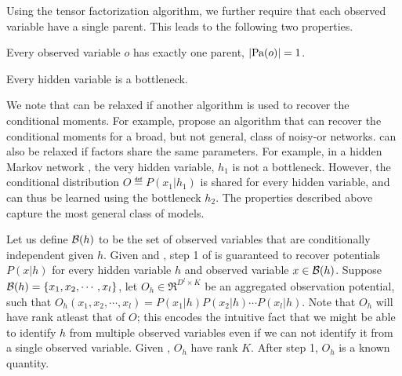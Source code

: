Using the tensor factorization algorithm, we further require that each
observed variable have a single parent. This leads to the following two
properties.

\begin{property}
  \label{prop:unique-parent}
  Every observed variable $o$ has exactly one parent, $|\textrm{Pa}(o)| = 1$.
\end{property}
\begin{property}
  \label{prop:bottleneck}
  Every hidden variable is a bottleneck.
\end{property}

We note that  can be relaxed if another
  algorithm is used to recover the conditional moments. For example,
  \citet{halpern13noisyor} propose an algorithm that can recover the
  conditional moments for a broad, but not general, class of noisy-or
  networks.
 can also be relaxed if factors share the same
  parameters. 
For example, in a hidden Markov network , the very hidden
  variable, $h_1$ is not a bottleneck. However, the conditional
  distribution $O \eqdef P(x_1|h_1)$ is shared for every hidden variable,
  and can thus be learned using the bottleneck $h_2$. 
The properties described above capture the most general class of models.

Let us define $\mathcal{B}(h)$ to be the set of observed variables that
  are conditionally independent given $h$. 
Given  and , step
  1 of  is guaranteed to recover potentials
  $P(x|h)$ for every hidden variable $h$ and observed variable $x \in
  \mathcal{B}(h)$.
Suppose $\mathcal{B}(h) = \{x_1, x_2, \cdots, x_l\}$, let $O_h \in
  \Re^{D^l \times K}$ be an
  aggregated observation potential, such that $O_h(x_1, x_2, \cdots,
  x_l) = P(x_1|h) P(x_2|h) \cdots P(x_l|h)$.
Note that $O_h$ will have rank atleast that of $O$; this encodes the
  intuitive fact that we might be able to identify $h$ from multiple
  observed variables even if we can not identify it from a single
  observed variable. 
Given , $O_h$ have rank $K$.
After step 1, $O_h$ is a known quantity.

